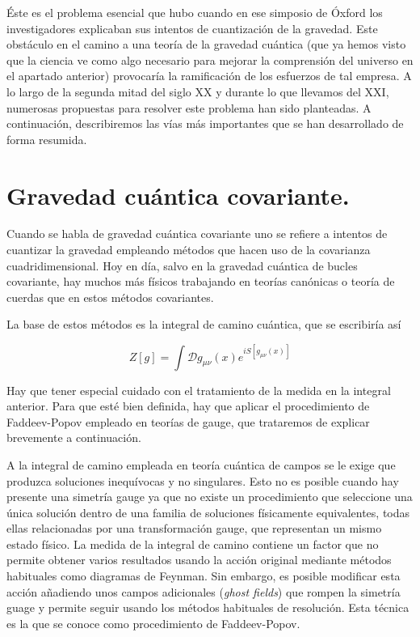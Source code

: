 \documentclass[11pt,a4paper,titlepage]{article}
\begin{document}
Éste es el problema esencial que hubo cuando en ese simposio de Óxford los investigadores explicaban sus intentos de cuantización de la gravedad. Este obstáculo en el camino a una teoría de la gravedad cuántica (que ya hemos visto que la ciencia ve como algo necesario para mejorar la comprensión del universo en el apartado anterior) provocaría la ramificación de los esfuerzos de tal empresa. A lo largo de la segunda mitad del siglo XX y durante lo que llevamos del XXI, numerosas propuestas para resolver este problema han sido planteadas. A continuación, describiremos las vías más importantes que se han desarrollado de forma resumida.
%
%
%
%
\newpage
\section{Gravedad cuántica covariante.}

Cuando se habla de gravedad cuántica covariante uno se refiere a intentos de cuantizar la gravedad empleando métodos que hacen uso de la covarianza cuadridimensional. Hoy en día, salvo en la gravedad cuántica de bucles covariante, hay muchos más físicos trabajando en teorías canónicas o teoría de cuerdas que en estos métodos covariantes.

La base de estos métodos es la integral de camino cuántica, que se escribiría así

\begin{equation*}
 Z[g]=\int\mathscr{D}g_{\mu\nu}(x)e^{iS[g_{\mu\nu}(x)]}
\end{equation*}

Hay que tener especial cuidado con el tratamiento de la medida en la integral anterior. Para que esté bien definida, hay que aplicar el procedimiento de Faddeev-Popov \cite{popov} empleado en teorías de gauge, que trataremos de explicar brevemente a continuación.

A la integral de camino empleada en teoría cuántica de campos se le exige que produzca soluciones inequívocas y no singulares. Esto no es posible cuando hay presente una simetría gauge ya que no existe un procedimiento que seleccione una única solución dentro de una familia de soluciones físicamente equivalentes, todas ellas relacionadas por una transformación gauge, que representan un mismo estado físico. La medida de la integral de camino contiene un factor que no permite obtener varios resultados usando la acción original mediante métodos habituales como diagramas de Feynman. Sin embargo, es posible modificar esta acción añadiendo unos campos adicionales (\emph{ghost fields}) que rompen la simetría guage y permite seguir usando los métodos habituales de resolución. Esta técnica es la que se conoce como procedimiento de Faddeev-Popov.
\end{document}
